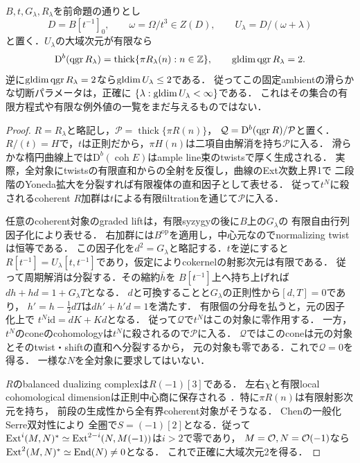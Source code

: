 \begin{lemma}[滑らかな中心境界と一つのアフィンchart]
\label{lem:r13-one-chart-smoothness}
$B,t,G_\lambda,R_\lambda$を前命題の通りとし
\[
 D=B[t^{-1}]_0,\qquad \omega=\Omega/t^3\in Z(D),\qquad
 U_\lambda=D/(\omega+\lambda)
\]
と置く．$U_\lambda$の大域次元が有限なら
\[
 \mathrm D^b(\operatorname{qgr} R_\lambda)
  =\operatorname{thick}\{\pi R_\lambda(n):n\in\mathbb Z\},
 \qquad \operatorname{gldim}\operatorname{qgr} R_\lambda=2.
\]
逆に$\operatorname{gldim}\operatorname{qgr} R_\lambda=2$なら$\operatorname{gldim} U_\lambda\le2$である．
従ってこの固定ambientの滑らかな切断パラメータは，正確に
$\{\lambda:\operatorname{gldim} U_\lambda<\infty\}$である．
これはその集合の有限方程式や有限な例外値の一覧をまだ与えるものではない．
\end{lemma}
\begin{proof}
$R=R_\lambda$と略記し，$\mathcal P=\operatorname{thick}\{\pi R(n)\}$，
$\mathcal Q=\mathrm D^b(\operatorname{qgr} R)/\mathcal P$と置く．
$R/(t)=H$で，$t$は正則だから，$\pi H(n)$は二項自由解消を持ち$\mathcal P$に入る．
滑らかな楕円曲線上では$\mathrm D^b(\operatorname{coh}E)$はample line束のtwistsで厚く生成される．
実際，全対象にtwistsの有限直和からの全射を反復し，曲線のExt次数上界1で
二段階のYoneda拡大を分裂すれば有限複体の直和因子として表せる．
従って$t^N$に殺されるcoherent $R$加群は$t$による有限filtrationを通じて$\mathcal P$に入る．

任意のcoherent対象のgraded liftは，有限syzygyの後に$B$上の$G_\lambda$の
有限自由行列因子化により表せる\cite[Theorems 4.7, 5.5]{CCKMcut}．
右加群には$B^{\mathrm{op}}$を適用し，中心元なのでnormalizing twistは恒等である．
この因子化を$d^2=G_\lambda$と略記する．$t$を逆にすると
$R[t^{-1}]=U_\lambda[t,t^{-1}]$であり，仮定によりcokernelの射影次元は有限である．
従って周期解消は分裂する．その縮約$\bar h$を
$B[t^{-1}]$上へ持ち上げれば$dh+hd=1+G_\lambda T$となる．
$d$と可換することと$G_\lambda$の正則性から$[d,T]=0$であり，
$h'=h-\frac12dT$は$dh'+h'd=1$を満たす．
有限個の分母を払うと，元の因子化上で
$t^N\mathrm{id}=dK+Kd$となる．
従って$\mathcal Q$で$t^N$はこの対象に零作用する．
一方，$t^N$のconeのcohomologyは$t^N$に殺されるので$\mathcal P$に入る．
$\mathcal Q$ではこのconeは元の対象とそのtwist・shiftの直和へ分裂するから，
元の対象も零である．これで$\mathcal Q=0$を得る．
一様な$N$を全対象に要求してはいない．

$R$のbalanced dualizing complexは$R(-1)[3]$である．
左右$\chi$と有限local cohomological dimensionは正則中心商に保存される
\cite{YZ}．特に$\pi R(n)$は有限射影次元を持ち，
前段の生成性から全有界coherent対象がそうなる．
Chen\cite[Theorem 3.10]{ChenCut}の一般化Serre双対性により
全圏で$S=(-1)[2]$となる．従って
$\operatorname{Ext}^i(M,N)^*\simeq\operatorname{Ext}^{2-i}(N,M(-1))$は$i>2$で零であり，
$M=\mathcal O,N=\mathcal O(-1)$なら$\operatorname{Ext}^2(M,N)^*\simeq\operatorname{End}(N)\ne0$となる．
これで正確に大域次元2を得る．


\end{proof}
